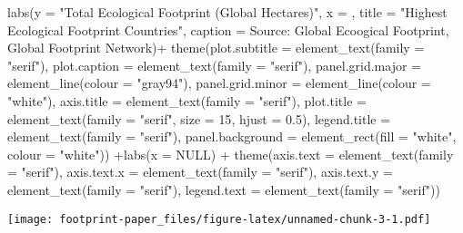 \documentclass[
]{article}
\newenvironment{Shaded}{\begin{snugshade}}{\end{snugshade}}
\newcommand{\AttributeTok}[1]{\textcolor[rgb]{0.77,0.63,0.00}{#1}}
\newcommand{\ConstantTok}[1]{\textcolor[rgb]{0.00,0.00,0.00}{#1}}
\newcommand{\DecValTok}[1]{\textcolor[rgb]{0.00,0.00,0.81}{#1}}
\newcommand{\FloatTok}[1]{\textcolor[rgb]{0.00,0.00,0.81}{#1}}
\newcommand{\FunctionTok}[1]{\textcolor[rgb]{0.00,0.00,0.00}{#1}}
\newcommand{\NormalTok}[1]{#1}
\newcommand{\SpecialCharTok}[1]{\textcolor[rgb]{0.00,0.00,0.00}{#1}}
\newcommand{\StringTok}[1]{\textcolor[rgb]{0.31,0.60,0.02}{#1}}
\begin{document}
\begin{Shaded}
\begin{Highlighting}[]
  \FunctionTok{labs}\NormalTok{(}\AttributeTok{y =} \StringTok{"Total Ecological Footprint (Global Hectares)"}\NormalTok{,}
       \AttributeTok{x =} \StringTok{\textquotesingle{}\textquotesingle{}}\NormalTok{,}
       \AttributeTok{title =} \StringTok{"Highest Ecological Footprint Countries"}\NormalTok{,}
       \AttributeTok{caption =} \StringTok{\textquotesingle{}Source: Global Ecoogical Footprint, Global Footprint Network\textquotesingle{}}\NormalTok{)}\SpecialCharTok{+}
    \FunctionTok{theme}\NormalTok{(}\AttributeTok{plot.subtitle =} \FunctionTok{element\_text}\NormalTok{(}\AttributeTok{family =} \StringTok{"serif"}\NormalTok{),}
    \AttributeTok{plot.caption =} \FunctionTok{element\_text}\NormalTok{(}\AttributeTok{family =} \StringTok{"serif"}\NormalTok{),}
    \AttributeTok{panel.grid.major =} \FunctionTok{element\_line}\NormalTok{(}\AttributeTok{colour =} \StringTok{"gray94"}\NormalTok{),}
    \AttributeTok{panel.grid.minor =} \FunctionTok{element\_line}\NormalTok{(}\AttributeTok{colour =} \StringTok{"white"}\NormalTok{),}
    \AttributeTok{axis.title =} \FunctionTok{element\_text}\NormalTok{(}\AttributeTok{family =} \StringTok{"serif"}\NormalTok{),}
    \AttributeTok{plot.title =} \FunctionTok{element\_text}\NormalTok{(}\AttributeTok{family =} \StringTok{"serif"}\NormalTok{,}
        \AttributeTok{size =} \DecValTok{15}\NormalTok{, }\AttributeTok{hjust =} \FloatTok{0.5}\NormalTok{), }\AttributeTok{legend.title =} \FunctionTok{element\_text}\NormalTok{(}\AttributeTok{family =} \StringTok{"serif"}\NormalTok{),}
    \AttributeTok{panel.background =} \FunctionTok{element\_rect}\NormalTok{(}\AttributeTok{fill =} \StringTok{"white"}\NormalTok{,}
        \AttributeTok{colour =} \StringTok{"white"}\NormalTok{)) }\SpecialCharTok{+}\FunctionTok{labs}\NormalTok{(}\AttributeTok{x =} \ConstantTok{NULL}\NormalTok{) }\SpecialCharTok{+} \FunctionTok{theme}\NormalTok{(}\AttributeTok{axis.text =} \FunctionTok{element\_text}\NormalTok{(}\AttributeTok{family =} \StringTok{"serif"}\NormalTok{),}
    \AttributeTok{axis.text.x =} \FunctionTok{element\_text}\NormalTok{(}\AttributeTok{family =} \StringTok{"serif"}\NormalTok{),}
    \AttributeTok{axis.text.y =} \FunctionTok{element\_text}\NormalTok{(}\AttributeTok{family =} \StringTok{"serif"}\NormalTok{),}
    \AttributeTok{legend.text =} \FunctionTok{element\_text}\NormalTok{(}\AttributeTok{family =} \StringTok{"serif"}\NormalTok{))}
\end{Highlighting}
\end{Shaded}

\texttt{[image: footprint-paper\_files/figure-latex/unnamed-chunk-3-1.pdf]}
\end{document}
